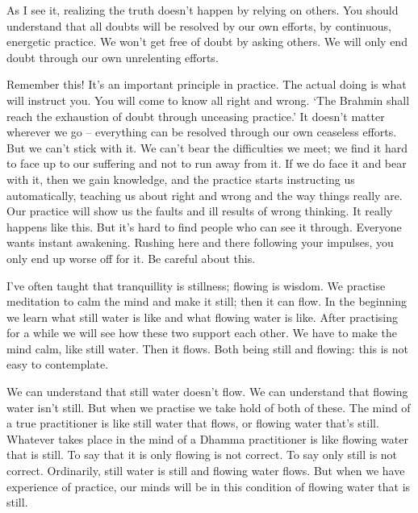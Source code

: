 As I see it, realizing the truth doesn't happen by relying on others. You should understand that all doubts will be resolved by our own efforts, by continuous, energetic practice. We won't get free of doubt by asking others. We will only end doubt through our own unrelenting efforts.

Remember this! It's an important principle in practice. The actual doing is what will instruct you. You will come to know all right and wrong. `The Brahmin shall reach the exhaustion of doubt through unceasing practice.' It doesn't matter wherever we go -- everything can be resolved through our own ceaseless efforts. But we can't stick with it. We can't bear the difficulties we meet; we find it hard to face up to our suffering and not to run away from it. If we do face it and bear with it, then we gain knowledge, and the practice starts instructing us automatically, teaching us about right and wrong and the way things really are. Our practice will show us the faults and ill results of wrong thinking. It really happens like this. But it's hard to find people who can see it through. Everyone wants instant awakening. Rushing here and there following your impulses, you only end up worse off for it. Be careful about this.

I've often taught that tranquillity is stillness; flowing is wisdom. We practise meditation to calm the mind and make it still; then it can flow. In the beginning we learn what still water is like and what flowing water is like. After practising for a while we will see how these two support each other. We have to make the mind calm, like still water. Then it flows. Both being still and flowing: this is not easy to contemplate.

We can understand that still water doesn't flow. We can understand that flowing water isn't still. But when we practise we take hold of both of these. The mind of a true practitioner is like still water that flows, or flowing water that's still. Whatever takes place in the mind of a Dhamma practitioner is like flowing water that is still. To say that it is only flowing is not correct. To say only still is not correct. Ordinarily, still water is still and flowing water flows. But when we have experience of practice, our minds will be in this condition of flowing water that is still.

